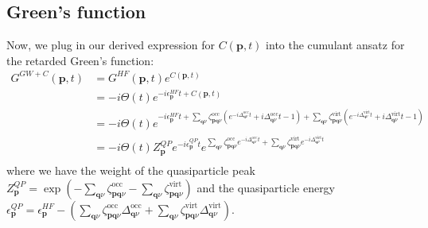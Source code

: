 \subsection{Green's function}
Now, we plug in our derived expression for $C(\bm{p}, t)$ into the cumulant ansatz for the retarded Green's function:
\begin{align}
G^{GW+C}(\bm{p}, t) & = G^{HF}(\bm{p}, t) e^{C(\bm{p}, t)} \\
& = -i \Theta(t) e^{-i \epsilon_{\bm{p}}^{HF} t + C(\bm{p}, t)} \\
& = -i \Theta(t) e^{-i \epsilon_{\bm{p}}^{HF} t + \sum_{\bm{q}\nu} \zeta_{\bm{p}\bm{q}\nu}^{\text{occ}}\left(e^{-i\Delta^{\text{occ}}_{\bm{q}\nu} t} + i\Delta^{\text{occ}}_{\bm{q}\nu} t - 1\right) + \sum_{\bm{q}\nu} \zeta_{\bm{p}\bm{q}\nu}^{\text{virt}} \left(e^{-i\Delta^{\text{virt}}_{\bm{q}\nu} t} + i\Delta^{\text{virt}}_{\bm{q}\nu} t - 1\right)}\\
&= -i \Theta (t) Z_{\bm{p}}^{QP} e^{-i \epsilon_{\bm{p}}^{QP} t} e^{\sum_{\bm{q}\nu} \zeta_{\bm{p}\bm{q}\nu}^{\text{occ}} e^{-i\Delta^{\text{occ}}_{\bm{q}\nu} t} + \sum_{\bm{q}\nu} \zeta_{\bm{p}\bm{q}\nu}^{\text{virt}} e^{-i\Delta^{\text{virt}}_{\bm{q}\nu} t}} \\
\end{align}
where we have the weight of the quasiparticle peak $Z_{\bm{p}}^{QP} = \exp\left(-\sum_{\bm{q}\nu} \zeta_{\bm{p}\bm{q}\nu}^{\text{occ}} - \sum_{\bm{q}\nu} \zeta_{\bm{p}\bm{q}\nu}^{\text{virt}}\right)$ and the quasiparticle energy $\epsilon_{\bm{p}}^{QP} = \epsilon_{\bm{p}}^{HF} - \left(\sum_{\bm{q}\nu} \zeta_{\bm{p}\bm{q}\nu}^{\text{occ}}\Delta^{\text{occ}}_{\bm{q}\nu} + \sum_{\bm{q}\nu} \zeta_{\bm{p}\bm{q}\nu}^{\text{virt}}\Delta^{\text{virt}}_{\bm{q}\nu}\right)$.
